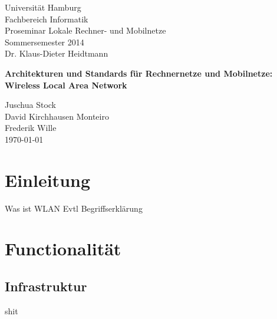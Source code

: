 \documentclass[a4paper,13pt]{scrartcl}
\begin{document}
\begin{titlepage}
\begin{small}
\vfill {Universität Hamburg \\ Fachbereich Informatik \\ Proseminar Lokale Rechner- und Mobilnetze \\ Sommersemester 2014 \\ Dr. Klaus-Dieter Heidtmann }
\end{small}


\begin{center}
\begin{Large}
\vfill {\textsf{\textbf{
Architekturen und Standards für Rechnernetze und Mobilnetze: 
Wireless Local Area Network
}}}
\end{Large}
\end{center}


\begin{small}
\vfill Juschua Stock \\ David Kirchhausen Monteiro \\ Frederik Wille \\
\today
\end{small}

\end{titlepage}


\tableofcontents
\thispagestyle{empty}

\clearpage

\onehalfspacing

\pagestyle{plain}


\section{Einleitung}

Was ist WLAN
Evtl Begriffserklärung



\section{Functionalität}

\subsection{Infrastruktur}

shit
\end{document}
